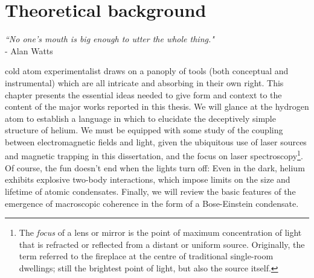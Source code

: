 





\chapter{Theoretical background}
\label{chap:theory}
	\begin{adjustwidth}{0cm}{0cm}
	\begin{flushright}
	\singlespacing
	\emph{``No one's mouth is big enough to utter the whole thing."\\} 
	- Alan Watts
	\end{flushright}
	\end{adjustwidth}
	\onehalfspacing
	\vspace{1cm}


	 cold atom experimentalist draws on a panoply of tools (both conceptual and instrumental) which are all intricate and absorbing in their own right.
	This chapter presents the essential ideas needed to give form and context to the content of the major works reported in this thesis.
	We will glance at the hydrogen atom to establish a language in which to elucidate the deceptively simple structure of helium.
	 We must be equipped with some study of the coupling between electromagnetic fields and light, given the ubiquitous use of laser sources and magnetic trapping in this dissertation, and the focus on laser spectroscopy\footnote{The \emph{focus} of a lens or mirror is the point of maximum concentration of light that is refracted or reflected from a distant or uniform source.
	Originally, the term referred to the fireplace at the centre of traditional single-room dwellings; still the brightest point of light, but also the source itself.}.
	Of course, the fun doesn't end when the lights turn off: Even in the dark, helium exhibits explosive two-body interactions, which impose limits on the size and lifetime of atomic condensates.
	Finally, we will review the basic features of the emergence of macroscopic coherence in the form of a Bose-Einstein condensate.
	
